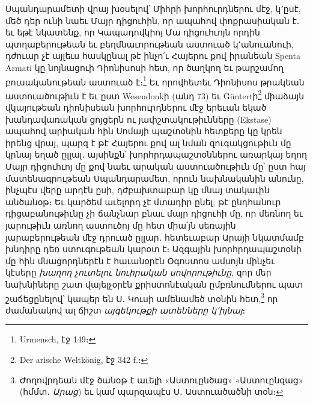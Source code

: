 \documentclass{article}
\begin{document}
{Սպանդարամետի վրայ խօսելով՝ Միհրի խորհուրդներու մէջ, կ՚ըսէ, մեծ դեր ունի նաեւ Մայր դիցուհին, որ ապահով փոքրասիական է․ եւ եթէ նկատենք, որ Կապադովկիոյ Մա դիցուհւոյն որդին պտղաբերութեան եւ բեղմնաւորութեան աստուած կ՚անուանուի, դժուար չէ այլեւս հասկընալ թէ ինչո՛ւ Հայերու քով իրանեան Spenta Armati կը նոյնացուի Դիոնիսոսի հետ, որ ծաղկող եւ թարշամող բուսականութեան աստուած է։\footnote{Urmensch, էջ 149։} Եւ որովհետեւ Դիոնիսոս թրակեան աստուածութիւն է եւ ըստ Wesendonkի (անդ 73) եւ Güntertի\footnote{Der arische Weltkönig, էջ 342 f.։} միաձայն վկայութեան դիոնիսեան խորհուրդներու մէջ երեւան եկած խանդավառական ցոյցերն ու յափշտակութիւնները (Ekstase) ապահով արիական հին Սոմայի պաշտօնին հետքերը կը կրեն իրենց վրայ, պարզ է թէ Հայերու քով ալ նման զուգակցութիւն մը կրնայ եղած ըլլալ․ այսինքն՝ խորհրդապաշտօններու առարկայ եղող Մայր դիցուհւոյ մը քով նաեւ արական աստուածութիւն մը՝ ըստ հայ մատենագրութեան Սպանդարամետ, որուն նախնականին անունը, ինչպէս վերը արդէն ըսի, դժբախտաբար կը մնայ տակաւին անծանօթ։ Եւ կարծեմ աւելորդ չէ մտադիր ընել, թէ ընդհանուր դիցաբանութիւնը չի ճանչնար բնաւ մայր դիցուհի մը, որ մեռնող եւ յարութիւն առնող աստուծոյ մը հետ միա՛յն սեռային յարաբերութեան մէջ դրուած ըլլար․ հետեւաբար Արայի նկատմամբ խնդիրը դեռ ստուգութեան կարօտ է։ Ազգային խորհրդապաշտօնի մը հին մնացորդներէն է հաւանօրէն Օգոստոս ամսոյն մինչեւ կէսերը \emph{խաղող չուտելու նուիրական սովորութիւնը}, զոր մեր նախնիները շատ վայելչօրէն քրիստոնէական ըմբռնումներու պատ շաճեցընելով՝ կապեր են Ս․ Կուսի ամենամեծ տօնին հետ,\footnote{Ժողովրդեան մէջ ծանօթ է աւելի «Աստուընծաց» «Աստուընզաց» (հմմտ․ \emph{Արաց}) եւ կամ պարզապէս Ս․ Աստուածածնի տօն։} որ ժամանակով ալ ճիշտ \emph{այգեկութքի ատենները կ՚իյնայ}։

}
\end{document}
